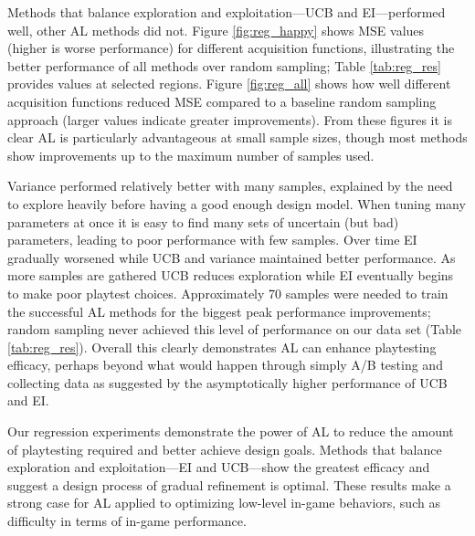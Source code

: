 \documentclass{sig-alternate}
\begin{document}
Methods that balance exploration and exploitation---UCB and EI---performed well, other AL methods did not.
Figure \ref{fig:reg_happy} shows MSE values (higher is worse performance) for different acquisition functions, illustrating the better performance of all methods over random sampling; Table \ref{tab:reg_res} provides values at selected regions.
Figure \ref{fig:reg_all} shows how well different acquisition functions reduced MSE compared to a baseline random sampling approach (larger values indicate greater improvements).
From these figures it is clear AL is particularly advantageous at small sample sizes, though most methods show improvements up to the maximum number of samples used.


Variance performed relatively better with many samples, explained by the need to explore heavily before having a good enough design model.
When tuning many parameters at once it is easy to find many sets of uncertain (but bad) parameters, leading to poor performance with few samples.
Over time EI gradually worsened while UCB and variance maintained better performance.
As more samples are gathered UCB reduces exploration while EI eventually begins to make poor playtest choices.
Approximately 70 samples were needed to train the successful AL methods for the biggest peak performance improvements; random sampling never achieved this level of performance on our data set (Table \ref{tab:reg_res}).
Overall this clearly demonstrates AL can enhance playtesting efficacy, perhaps beyond what would happen through simply A/B testing and collecting data as suggested by the asymptotically higher performance of UCB and EI.

Our regression experiments demonstrate the power of AL to reduce the amount of playtesting required and better achieve design goals.
Methods that balance exploration and exploitation---EI and UCB---show the greatest efficacy and suggest a design process of gradual refinement is optimal.
These results make a strong case for AL applied to optimizing low-level in-game behaviors, such as difficulty in terms of in-game performance.
\end{document}
